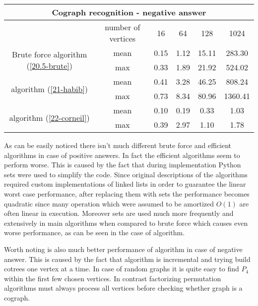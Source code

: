\begin{center}

    \begin{tabular}{ |c|c|c|c|c|c|}
        \hline
        \multicolumn{6}{|c|}{Cograph recognition - negative answer}                                                       \\
        \hline
                                                                     & number of vertices & 16   & 64   & 128   & 1024    \\
        \hline
        \multirow{2}{*}{Brute force algorithm (\ref{20.5-brute})}    & mean               & 0.15 & 1.12 & 15.11 & 283.30  \\
                                                                     & max                & 0.33 & 1.89 & 21.92 & 524.02  \\
        \hline
        \multirow{2}{*}{\cite{habib} algorithm (\ref{21-habib})}     & mean               & 0.41 & 3.28 & 46.25 & 808.24  \\
                                                                     & max                & 0.73 & 8.34 & 80.96 & 1360.41 \\
        \hline
        \multirow{2}{*}{\cite{corneil} algorithm (\ref{22-corneil})} & mean               & 0.10 & 0.19 & 0.33  & 1.03    \\
                                                                     & max                & 0.39 & 2.97 & 1.10  & 1.78    \\

        \hline
    \end{tabular}
\end{center}

As can be easily noticed there isn't much different brute force and efficient algorithms in case of positive answers. In fact the efficient algorithms seem to perform worse. This is caused by the fact that during implementation Python sets were used to simplify the code. Since original descriptions of the algorithms required custom implementations of linked lists in order to guarantee the linear worst case performance, after replacing them with sets the performance becomes quadratic since many operation which were assumed to be amortized $O(1)$ are often linear in execution. Moreover sets are used much more frequently and extensively in main algorithms when compared to brute force which causes even worse performance, as can be seen in the case of \cite{habib} algorithm.

Worth noting is also much better performance of \cite{corneil} algorithm in case of negative answer. This is caused by the fact that algorithm is incremental and trying build cotrees one vertex at a time. In case of random graphs it is quite easy to find $P_4$ within the first few chosen vertices. In contrast factorizing permutation algorithms must always process all vertices before checking whether graph is a cograph.

